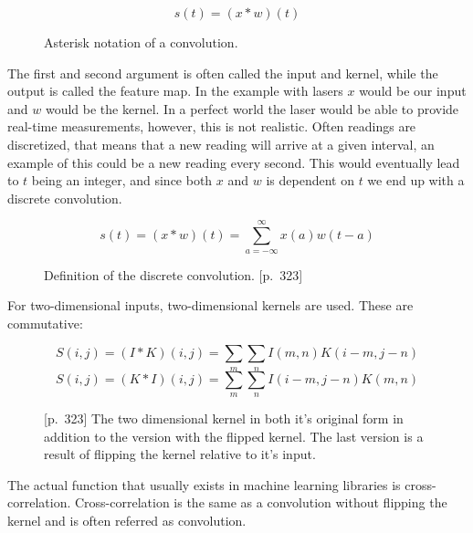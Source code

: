 \begin{figure}[H]
    \label{fig:conv_asterisk}
    \begin{equation}
        s(t) = (x*w)(t)
    \end{equation}
    \caption{Asterisk notation of a convolution.}
\end{figure}
The first and second argument is often called the input and kernel, while the output is called the feature map. In the example with lasers $x$ would be our input and $w$ would be the kernel. %
In a perfect world the laser would be able to provide real-time measurements, however, this is not realistic. Often readings are discretized, that means that a new reading will arrive at a given interval, an example of this could be a new reading every second. This would eventually lead to $t$ being an integer, and since both $x$ and $w$ is dependent on $t$ we end up with a discrete convolution. \parencite{goodfellow_deep_2016}
\begin{figure}[H]
    \label{fig:disc_conv}
    \begin{equation}
        s(t) = (x*w)(t) = \sum_{a=-\infty}^{\infty} x(a)w(t-a)
    \end{equation}
    \caption{Definition of the discrete convolution. \cite{goodfellow_deep_2016}[p.~323]}
\end{figure}

For two-dimensional inputs, two-dimensional kernels are used. These are commutative:

\begin{figure}[H]
    \label{fig:disc_conv2d}
    \begin{equation}
        S(i,j) = (I*K)(i,j) = \sum_{m} \sum_{n} I(m,n)K(i-m,j-n)
    \end{equation}
    \begin{equation}
        S(i,j) = (K*I)(i,j) = \sum_{m} \sum_{n} I(i-m,j-n)K(m,n)
    \end{equation}
    \caption{\cite{goodfellow_deep_2016}[p.~323] The two dimensional kernel in both it's original form in addition to the version with the flipped kernel. The last version is a result of flipping the kernel relative to it's input.}
\end{figure}

The actual function that usually exists in machine learning libraries is cross-correlation. Cross-correlation is the same as a convolution without flipping the kernel and is often referred as convolution.

